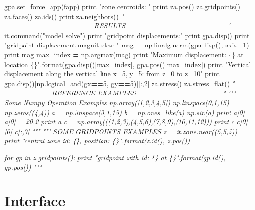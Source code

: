 \documentclass[a4paper, nobind]{templates/ociamthesis}
\newenvironment{Shaded}{\begin{snugshade}}{\end{snugshade}}
\newcommand{\BuiltInTok}[1]{#1}
\newcommand{\CommentTok}[1]{\textcolor[rgb]{0.56,0.35,0.01}{\textit{#1}}}
\newcommand{\DecValTok}[1]{\textcolor[rgb]{0.00,0.00,0.81}{#1}}
\newcommand{\NormalTok}[1]{#1}
\newcommand{\OperatorTok}[1]{\textcolor[rgb]{0.81,0.36,0.00}{\textbf{#1}}}
\newcommand{\SpecialCharTok}[1]{\textcolor[rgb]{0.00,0.00,0.00}{#1}}
\newcommand{\StringTok}[1]{\textcolor[rgb]{0.31,0.60,0.02}{#1}}
\renewenvironment{Shaded}
{
  \vspace{10pt}%
  \begin{snugshade}%
}{%
  \end{snugshade}%
  \vspace{8pt}%
}
\begin{document}
\begin{Shaded}
\begin{Highlighting}[]
\NormalTok{gpa.set\_force\_app(fapp)}
\BuiltInTok{print} \StringTok{"zone centroids: "}
\BuiltInTok{print}\NormalTok{ za.pos()}
\NormalTok{za.gridpoints()}
\NormalTok{za.faces()}
\NormalTok{za.ids()}
\BuiltInTok{print}\NormalTok{ za.neighbors()}
\CommentTok{" =================RESULTS=================== "}
\NormalTok{it.command(}\StringTok{"model solve"}\NormalTok{)}
\BuiltInTok{print} \StringTok{"gridpoint displacements:"}
\BuiltInTok{print}\NormalTok{ gpa.disp()}
\BuiltInTok{print} \StringTok{"gridpoint displacement magnitudes: "}
\NormalTok{mag }\OperatorTok{=}\NormalTok{ np.linalg.norm(gpa.disp(), axis}\OperatorTok{=}\DecValTok{1}\NormalTok{)}
\BuiltInTok{print}\NormalTok{ mag}
\NormalTok{max\_index }\OperatorTok{=}\NormalTok{ np.argmax(mag)}
\BuiltInTok{print} \StringTok{"Maximum displacement: }\SpecialCharTok{\{\}}\StringTok{ at location }\SpecialCharTok{\{\}}\StringTok{"}\NormalTok{.}\BuiltInTok{format}\NormalTok{(gpa.disp()[max\_index],}
\NormalTok{                                              gpa.pos()[max\_index])}
\BuiltInTok{print} \StringTok{"Vertical displacement along the vertical line x=5, y=5: from z=0 to z=10"}
\BuiltInTok{print}\NormalTok{ gpa.disp()[np.logical\_and(gx}\OperatorTok{==}\DecValTok{5}\NormalTok{, gy}\OperatorTok{==}\DecValTok{5}\NormalTok{)][:,}\DecValTok{2}\NormalTok{]}
\NormalTok{za.stress()}
\NormalTok{za.stress\_flat()}
\CommentTok{" =========REFERENCE EXAMPLES================ "}
\CommentTok{""" Some Numpy Operation Examples}
\CommentTok{np.array([1,2,3,4,5])}
\CommentTok{np.linspace(0,1,15)}
\CommentTok{np.zeros((4,4))}
\CommentTok{a = np.linspace(0,1,15)}
\CommentTok{b = np.ones\_like(a)}
\CommentTok{np.sin(a)}
\CommentTok{print a[0]}
\CommentTok{a[0] = 20.2}
\CommentTok{print a}
\CommentTok{c = np.array(((1,2,3),(4,5,6),(7,8,9),(10,11,12)))}
\CommentTok{print c}
\CommentTok{c[0][0]}
\CommentTok{c[:,0]}
\CommentTok{"""}
\CommentTok{""" SOME GRIDPOINTS EXAMPLES}
\CommentTok{z = it.zone.near((5,5,5))}
\CommentTok{print "central zone id: \{\}, position: \{\}".format(z.id(), z.pos())}

\CommentTok{for gp in z.gridpoints():}
\CommentTok{    print "gridpoint with id: \{\} at \{\}".format(gp.id(), gp.pos())}
\CommentTok{"""}
\end{Highlighting}
\end{Shaded}

\hypertarget{interface-1}{%
\section{Interface}\label{interface-1}}
\end{document}
